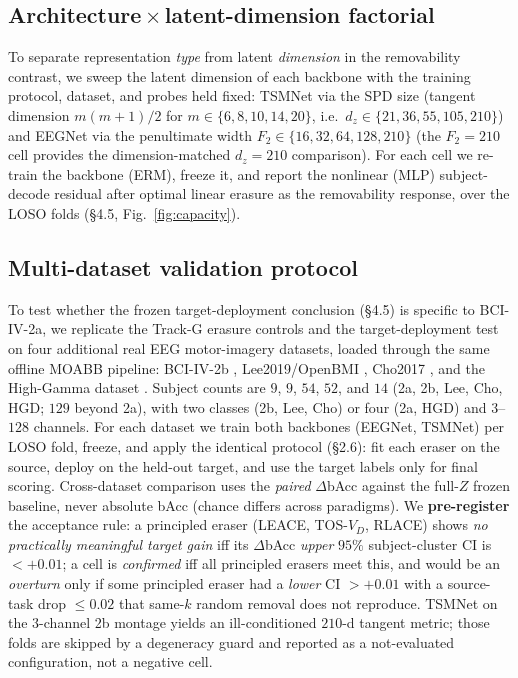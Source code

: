 \subsection{Architecture\,$\times$\,latent-dimension factorial}
To separate representation \emph{type} from latent \emph{dimension} in the removability contrast, we sweep
the latent dimension of each backbone with the training protocol, dataset, and probes held fixed: TSMNet via
the SPD size (tangent dimension $m(m{+}1)/2$ for $m\in\{6,8,10,14,20\}$, i.e.\ $d_z\in\{21,36,55,105,210\}$) and
EEGNet via the penultimate width $F_2\in\{16,32,64,128,210\}$ (the $F_2{=}210$ cell provides the dimension-matched $d_z{=}210$ comparison).
For each cell we re-train the backbone (ERM), freeze it, and report the nonlinear (MLP) subject-decode residual
after optimal linear erasure as the removability response, over the LOSO folds (\S4.5, Fig.~\ref{fig:capacity}).

\subsection{Multi-dataset validation protocol}
To test whether the frozen target-deployment conclusion (\S4.5) is specific to BCI-IV-2a, we replicate the
Track-G erasure controls and the target-deployment test on four additional real EEG motor-imagery datasets,
loaded through the same offline MOABB pipeline: BCI-IV-2b \citep{leeb2008bci}, Lee2019/OpenBMI
\citep{lee2019eeg}, Cho2017 \citep{cho2017eeg}, and the High-Gamma dataset \citep{schirrmeister2017deep}.
Subject counts are $9$, $9$, $54$, $52$, and $14$ (2a, 2b, Lee, Cho, HGD; $129$ beyond 2a), with two
classes (2b, Lee, Cho) or four (2a, HGD) and $3$--$128$ channels. For each dataset we train both backbones
(EEGNet, TSMNet) per LOSO fold, freeze, and apply the identical protocol (\S2.6): fit each eraser on the
source, deploy on the held-out target, and use the target labels only for final scoring. Cross-dataset
comparison uses the \emph{paired} $\Delta$bAcc against the full-$Z$ frozen baseline, never absolute bAcc
(chance differs across paradigms). We \textbf{pre-register} the acceptance rule: a principled eraser (LEACE,
TOS-$V_D$, RLACE) shows \emph{no practically meaningful target gain} iff its $\Delta$bAcc \emph{upper} $95\%$
subject-cluster CI is $<{+}0.01$; a cell is \emph{confirmed} iff all principled erasers meet this, and would be
an \emph{overturn} only if some principled eraser had a \emph{lower} CI $>{+}0.01$ with a source-task drop
$\le 0.02$ that same-$k$ random removal does not reproduce. TSMNet on the $3$-channel 2b montage yields an
ill-conditioned $210$-d tangent metric; those folds are skipped by a degeneracy guard and reported as a
not-evaluated configuration, not a negative cell.

